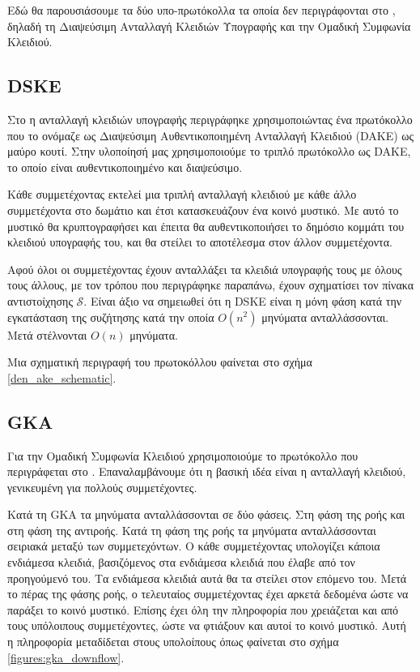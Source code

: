 Εδώ θα παρουσιάσουμε τα δύο υπο-πρωτόκολλα τα οποία δεν περιγράφονται στο \cite{mpotr}, δηλαδή τη Διαψεύσιμη Ανταλλαγή Κλειδιών Υπογραφής και την Ομαδική Συμφωνία Κλειδιού.

\subsection{DSKE}
\label{dske_subprot}

Στο\cite{mpotr} η ανταλλαγή κλειδιών υπογραφής περιγράφηκε χρησιμοποιώντας ένα πρωτόκολλο που το ονόμαζε ως Διαψεύσιμη Αυθεντικοποιημένη Ανταλλαγή Κλειδιού (DAKE) ως μαύρο κουτί.
Στην υλοποίησή μας χρησιμοποιούμε το τριπλό \dhname πρωτόκολλο ως DAKE, το οποίο είναι αυθεντικοποιημένο και διαψεύσιμο.

Κάθε συμμετέχοντας εκτελεί μια τριπλή \dhname ανταλλαγή κλειδιού με κάθε άλλο συμμετέχοντα στο δωμάτιο και έτσι κατασκευάζουν ένα κοινό μυστικό.
Με αυτό το μυστικό θα κρυπτογραφήσει και έπειτα θα αυθεντικοποιήσει το δημόσιο κομμάτι του κλειδιού υπογραφής του, και θα στείλει το αποτέλεσμα στον άλλον συμμετέχοντα.

Αφού όλοι οι συμμετέχοντας έχουν ανταλλάξει τα κλειδιά υπογραφής τους με όλους τους άλλους, με τον τρόπου που περιγράφηκε παραπάνω, έχουν σχηματίσει τον πίνακα αντιστοίχησης $\mathcal{S}$.
Είναι άξιο να σημειωθεί ότι η DSKE είναι η μόνη φάση κατά την εγκατάσταση της συζήτησης κατά την οποία $O(n^2)$ μηνύματα ανταλλάσσονται.
Μετά στέλνονται $O(n)$ μηνύματα.

Μια σχηματική περιγραφή του πρωτοκόλλου φαίνεται στο σχήμα \ref{den_ake_schematic}.


\subsection{GKA}
\label{gka_subprot}


Για την Ομαδική Συμφωνία Κλειδιού χρησιμοποιούμε το πρωτόκολλο που περιγράφεται στο \cite{mpenc}.
Επαναλαμβάνουμε ότι η βασική ιδέα είναι η \dhname ανταλλαγή κλειδιού, γενικευμένη για πολλούς συμμετέχοντες.

Κατά τη GKA τα μηνύματα ανταλλάσσονται σε δύο φάσεις. Στη φάση της ροής και στη φάση της αντιροής.
Κατά τη φάση της ροής τα μηνύματα ανταλλάσσονται σειριακά μεταξύ των συμμετεχόντων.
Ο κάθε συμμετέχοντας υπολογίζει κάποια ενδιάμεσα κλειδιά, βασιζόμενος στα ενδιάμεσα κλειδιά που έλαβε από τον προηγούμενό του.
Τα ενδιάμεσα κλειδιά αυτά θα τα στείλει στον επόμενο του.
Μετά το πέρας της φάσης ροής, ο τελευταίος συμμετέχοντας έχει αρκετά δεδομένα ώστε να παράξει το κοινό μυστικό.
Επίσης έχει όλη την πληροφορία που χρειάζεται και από τους υπόλοιπους συμμετέχοντες, ώστε να φτιάξουν και αυτοί το κοινό μυστικό.
Αυτή η πληροφορία μεταδίδεται στους υπολοίπους όπως φαίνεται στο σχήμα \ref{figures:gka_downflow}.

